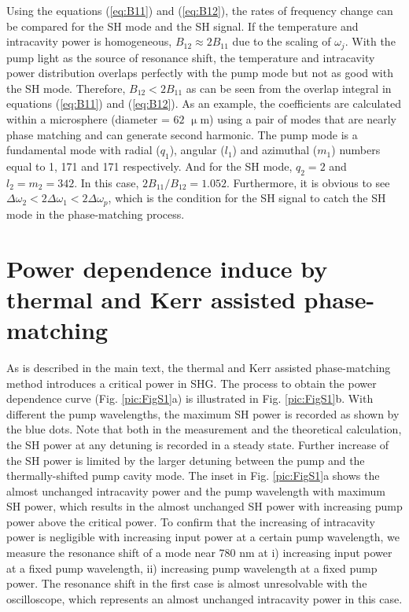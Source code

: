 \documentclass[a4paper,8pt,hyperref, aps, prl]{article}
\begin{document}
Using the equations (\ref{eq:B11}) and (\ref{eq:B12}), the rates of frequency change can be compared for the SH mode and the SH signal. If the temperature and intracavity power is homogeneous, $B_{12} \approx 2B_{11}$ due to the scaling of $\omega_j$. With the pump light as the source of resonance shift, the temperature and intracavity power distribution overlaps perfectly with the pump mode but not as good with the SH mode. Therefore, $B_{12} < 2B_{11}$ as can be seen from the overlap integral in equations (\ref{eq:B11}) and (\ref{eq:B12}). As an example, the coefficients are calculated within a microsphere (diameter = $62$ $\upmu$m) using a pair of modes that are nearly phase matching and can generate second harmonic. The pump mode is a fundamental mode with radial ($q_1$), angular ($l_1$) and azimuthal ($m_1$) numbers equal to 1, 171 and 171 respectively. And for the SH mode, $q_2=2$ and $l_2 = m_2 = 342$. In this case, $2B_{11}/B_{12} = 1.052$. Furthermore,        it is obvious to see $\Delta \omega_2<2\Delta \omega_1<2\Delta \omega_p$, which is the condition for the SH signal to catch the SH mode in the phase-matching process.

\section{Power dependence induce by thermal and Kerr assisted phase-matching}

As is described in the main text, the thermal and Kerr assisted phase-matching method introduces a critical power in SHG. The process to obtain the power dependence curve (Fig. \ref{pic:FigS1}a) is illustrated in Fig. \ref{pic:FigS1}b. With different the pump wavelengths, the maximum SH power is recorded as shown by the blue dots. Note that both in the measurement and the theoretical calculation, the SH power at any detuning is recorded in a steady state. 
Further increase of the SH power is limited by the larger detuning between the pump and the thermally-shifted pump cavity mode. 
The inset in Fig. \ref{pic:FigS1}a shows the almost unchanged intracavity power and the pump wavelength with maximum SH power, which results in the almost unchanged SH power with increasing pump power above the critical power. 
To confirm that the increasing of intracavity power is negligible with increasing input power at a certain pump wavelength, we measure the resonance shift of a mode near 780 nm at i) increasing input power at a fixed pump wavelength, ii) increasing pump wavelength at a fixed pump power. The resonance shift in the first case is almost unresolvable with the oscilloscope, which represents an almost unchanged intracavity power in this case.
\end{document}
